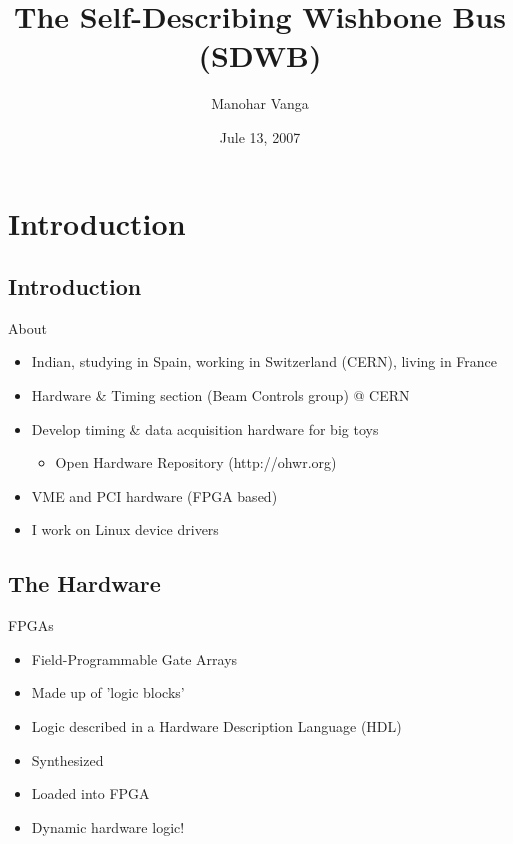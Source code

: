 \documentclass{beamer}
\title[SDWB\hspace{2em}\insertframenumber/ \inserttotalframenumber]{The Self-Describing Wishbone Bus (SDWB)}
\author{Manohar Vanga}
\institute{BE-CO-HT, CERN, Geneva}
\date{Jule 13, 2007}
\begin{document}
\begin{frame}
\titlepage
\end{frame}

%

\section{Introduction}
\subsection{Introduction}
\begin{frame}{About}
  \begin{itemize}
    \pause \item Indian\pause, studying in Spain\pause, working in Switzerland (CERN)\pause, living in France
    \pause \item Hardware \& Timing section (Beam Controls group) @ CERN
    \pause \item Develop timing \& data acquisition hardware for big toys
      \begin{itemize}
        \item Open Hardware Repository (http://ohwr.org)
      \end{itemize}
    \pause \item VME and PCI hardware (FPGA based)
    \pause \item I work on Linux device drivers
  \end{itemize}
\end{frame}

\subsection{The Hardware}
\begin{frame}{FPGAs}
  \begin{itemize}
    \pause \item Field-Programmable Gate Arrays%
    \pause \item Made up of 'logic blocks' %
    \pause \item Logic described in a Hardware Description Language (HDL)
    \pause \item Synthesized
    \pause \item Loaded into FPGA
    \pause \item Dynamic hardware logic!
  \end{itemize}
\end{frame}
\end{document}
